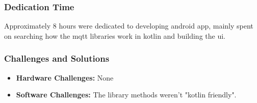 \subsubsection{Dedication Time}
Approximately 8 hours were dedicated to developing android app, mainly spent on searching how the mqtt libraries work in kotlin and building the ui.

\subsubsection{Challenges and Solutions}
\begin{itemize}
    \item \textbf{Hardware Challenges:} None
    \item \textbf{Software Challenges:} The library methods weren't "kotlin friendly".
\end{itemize}
